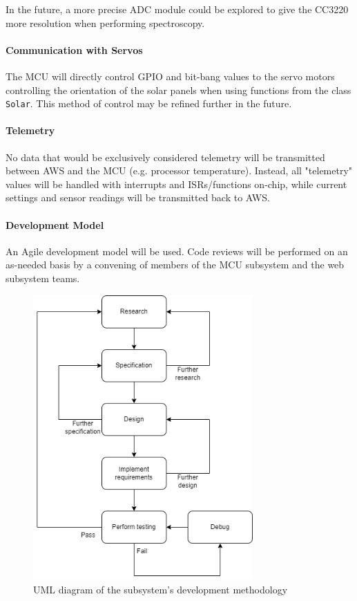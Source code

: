 In the future, a more precise ADC module could be explored to give the
CC3220 more resolution when performing spectroscopy.

\paragraph{Communication with Servos}
The MCU will directly control GPIO and bit-bang values to the servo motors
controlling the orientation of the solar panels when using functions from
the class \texttt{Solar}. This method of control may be refined further in
the future.

\paragraph{Telemetry}
No data that would be exclusively considered telemetry will be transmitted 
between AWS and the MCU (e.g. processor temperature). Instead, all
"telemetry" values will be handled with interrupts and ISRs/functions
on-chip, while current settings and sensor readings will be transmitted
back to AWS.

\paragraph{Development Model}
An Agile development model will be used. Code reviews will be performed on
an as-needed basis by a convening of members of the MCU subsystem and the
web subsystem teams.
\begin{figure}[H]
    \caption{UML diagram of the subsystem's development methodology}
    \label{mcu_agile_uml}
    \centering
    \includegraphics[width=0.75\textwidth]{images/mcu_agile_uml.png}
\end{figure}

